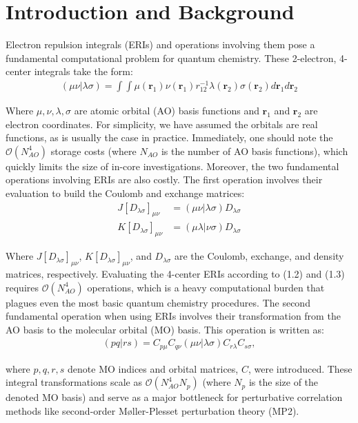 \chapter{Introduction and Background}

Electron repulsion integrals (ERIs) and operations involving them pose a fundamental
computational problem for quantum chemistry. These 2-electron, 4-center integrals take the form:
\begin{align}(\mu \nu | \lambda \sigma) = \int \int \mu(\textbf{r}_{1}) 
\nu(\textbf{r}_{1}) r^{-1}_{12} \lambda(\textbf{r}_{2}) \sigma(\textbf{r}_{2}) 
d{\textbf{r}_{1}}d{\textbf{r}_{2}}
\end{align}

Where $\mu, \nu, \lambda, \sigma$ are atomic orbital (AO) basis functions and $\textbf{r}_{1}$ and $\textbf{r}_{2}$
are electron coordinates. For simplicity, we have assumed the orbitals are real functions, as is usually
the case in practice. Immediately, one should note the $\mathcal{O}(N_{AO}^4)$ storage costs (where $N_{AO}$ is
the number of AO basis functions), which quickly 
limits the size of in-core investigations. Moreover, the two fundamental operations involving ERIs 
are also costly. The first operation involves their evaluation to build the Coulomb and exchange matrices:
\begin{align}
J[D_{\lambda \sigma}]_{\mu \nu} &= (\mu \nu|\lambda \sigma)D_{\lambda \sigma} \\
K[D_{\lambda \sigma}]_{\mu \nu} &= (\mu \lambda|\nu \sigma)D_{\lambda \sigma}
\end{align}

\noindent Where $J[D_{\lambda \sigma}]_{\mu \nu}$, $K[D_{\lambda \sigma}]_{\mu \nu}$, 
and $D_{\lambda \sigma}$ are the Coulomb, exchange, and density matrices, respectively.
Evaluating the 4-center ERIs according to (1.2) and (1.3) requires $\mathcal{O}(N_{AO}^4)$ operations, 
which is a heavy computational burden that plagues even the most basic quantum chemistry procedures. 
The second fundamental operation when using ERIs involves their transformation from the AO basis 
to the molecular orbital (MO) basis. This operation is written as:
\begin{align}
(pq | rs) = C_{p \mu}C_{q \nu}
(\mu \nu | \lambda \sigma)C_{r\lambda}C_{s\sigma},
\end{align} 

\noindent where $p,q,r,s$ denote MO indices and orbital matrices, $C$, were introduced. These integral transformations scale 
as $\mathcal{O}(N_{AO}^4N_p)$ (where $N_p$ is the size of the denoted MO basis) and serve as a major 
bottleneck for perturbative correlation methods like second-order M{\o}ller-Plesset perturbation theory (MP2).

